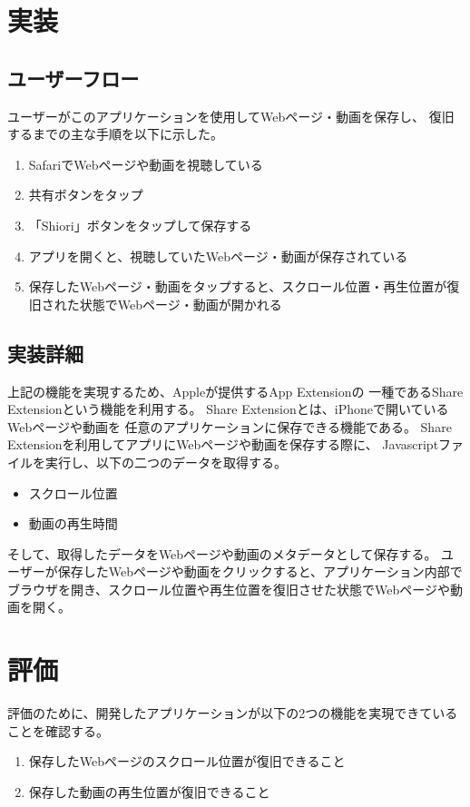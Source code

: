 \documentclass[a4j,10pt]{jsarticle}
\begin{document}
\section{実装}
\subsection{ユーザーフロー}
ユーザーがこのアプリケーションを使用してWebページ・動画を保存し、
復旧するまでの主な手順を以下に示した。
\begin{enumerate}
\item SafariでWebページや動画を視聴している
\item 共有ボタンをタップ
\item 「Shiori」ボタンをタップして保存する
\item アプリを開くと、視聴していたWebページ・動画が保存されている
\item 保存したWebページ・動画をタップすると、スクロール位置・再生位置が復旧された状態でWebページ・動画が開かれる
\end{enumerate}

\subsection{実装詳細}
上記の機能を実現するため、Appleが提供するApp Extension\cite{App-Extension}の
一種であるShare Extension\cite{Share-Extension}という機能を利用する。
Share Extensionとは、iPhoneで開いているWebページや動画を
任意のアプリケーションに保存できる機能である。
Share Extensionを利用してアプリにWebページや動画を保存する際に、
Javascriptファイルを実行し、以下の二つのデータを取得する。
\begin{itemize}
\item スクロール位置
\item 動画の再生時間
\end{itemize}

そして、取得したデータをWebページや動画のメタデータとして保存する。
ユーザーが保存したWebページや動画をクリックすると、アプリケーション内部で
ブラウザを開き、スクロール位置や再生位置を復旧させた状態でWebページや動画を開く。


\section{評価}
評価のために、開発したアプリケーションが以下の2つの機能を実現できていることを確認する。
\begin{enumerate}
\item 保存したWebページのスクロール位置が復旧できること
\item 保存した動画の再生位置が復旧できること
\end{enumerate}
\end{document}
